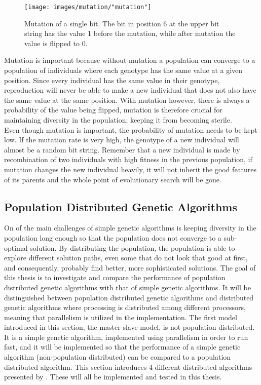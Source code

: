 \begin{figure}[h!]
\begin{center}
\texttt{[image: images/mutation/"mutation"]}
\caption{Mutation of a single bit. The bit in position 6 at the upper bit string has the value 1 before the mutation, while after mutation the value is flipped to 0.}
\label{Mutation}
\end{center}
\end{figure}


\noindent Mutation is important because without mutation a population can converge to a population of individuals where each genotype has the same value at a given position. Since every individual has the same value in their genotype, reproduction will never be able to make a new individual that does not also have the same value at the same position. With mutation however, there is always a probability of the value being flipped, mutation is therefore crucial for maintaining diversity in the population; keeping it from becoming sterile.\\


\noindent Even though mutation is important, the probability of mutation needs to be kept low. If the mutation rate is very high, the genotype of a new individual will almost be a random bit string. Remember that a new individual is made by recombination of two individuals with high fitness in the previous population, if mutation changes the new individual heavily, it will not inherit the good features of its parents and the whole point of evolutionary search will be gone.\\


\subsection{Population Distributed Genetic Algorithms}\label{subsection:dga}
On of the main challenges of simple genetic algorithms is keeping diversity in the population long enough so that the population does not converge to a sub-optimal solution. By distributing the population, the population is able to explore different solution paths, even some that do not look that good at first, and consequently, probably find better, more sophisticated solutions. The goal of this thesis is to investigate and compare the performance of population distributed genetic algorithms with that of simple genetic algorithms. It will be distinguished between population distributed genetic algorithms and distributed genetic algorithms where processing is distributed among different processors, meaning that parallelism is utilized in the implementation. The first model introduced in this section, the master-slave model, is not population distributed. It is a simple genetic algorithm, implemented using parallelism in order to run fast, and it will be implemented so that the performance of a simple genetic algorithm (non-population distributed) can be compared to a population distributed algorithm. This section introduces 4 different distributed algorithms presented by \cite{Gong}. These will all be implemented and tested in this thesis.\\


